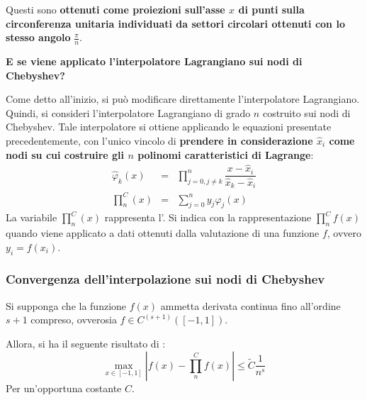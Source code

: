 \noindent
Questi  sono \textbf{ottenuti come proiezioni sull'asse $x$ di punti sulla circonferenza unitaria individuati da settori circolari ottenuti con lo stesso angolo} $\frac{\pi}{n}$.

\highspace
\begin{flushleft}
	\textcolor{Green3}{ \textbf{E se viene applicato l'interpolatore Lagrangiano sui nodi di Chebyshev?}}
\end{flushleft}
Come detto all'inizio, si può modificare direttamente l'interpolatore Lagrangiano. Quindi, si consideri l'interpolatore Lagrangiano di grado $n$ costruito sui nodi di Chebyshev. Tale interpolatore si ottiene applicando le equazioni presentate precedentemente, con l'unico vincolo di \textbf{prendere in considerazione $\widehat{x}_{i}$ come nodi su cui costruire gli $n$ polinomi caratteristici di Lagrange}:
\begin{equation}
	\begin{array}{rcl}
		\widehat{\varphi}_{k}\left(x\right) &=& \displaystyle\prod_{j = 0, j \ne k}^{n} \dfrac{x - \widehat{x}_{i}}{\widehat{x}_{k} - \widehat{x}_{i}} \\ [1.5em]
		\displaystyle\prod_{n}^{C}\left(x\right) &=& \displaystyle\sum_{j=0}^{n} y_{j} \widehat{\varphi}_{j}\left(x\right)
	\end{array}
\end{equation}
La variabile $\prod_{n}^{C} \left(x\right)$ rappresenta l'. Si indica con la rappresentazione $\prod_{n}^{C} f\left(x\right)$ quando viene applicato a dati ottenuti dalla valutazione di una funzione $f$, ovvero $y_{i} = f\left(x_{i}\right)$.

\longline

\subsubsection{Convergenza dell'interpolazione sui nodi di Chebyshev}

\begin{theorem}
	Si supponga che la funzione $f\left(x\right)$ ammetta derivata continua fino all'ordine $s+1$ compreso, ovverosia $f \in C^{\left(s+1\right)}\left(\left[-1,1\right]\right)$.
	
	\highspace
	Allora, si ha il seguente risultato di :
	\begin{equation}
		\underset{x \in \left[-1,1\right]}{\max} \left|f\left(x\right) - \displaystyle\prod_{n}^{C} f\left(x\right)\right| \le \tilde{C} \dfrac{1}{n^{s}}
	\end{equation}
	Per un'opportuna costante $C$.
\end{theorem}


